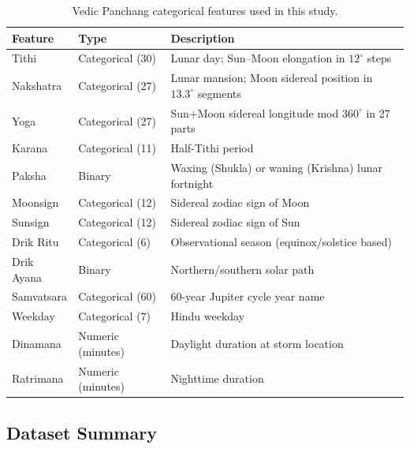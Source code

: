 \documentclass[12pt,a4paper]{article}
\begin{document}
    \begin{table}[H]
    \centering
    \caption{Vedic Panchang categorical features used in this study.}
    \label{tab:panchang_features}
    \small
    \begin{tabular}{llp{7.5cm}}
        \toprule
        \textbf{Feature} & \textbf{Type} & \textbf{Description} \\
        \midrule
        Tithi       & Categorical (30)  & Lunar day; Sun--Moon elongation in $12^\circ$ steps \\
        Nakshatra   & Categorical (27)  & Lunar mansion; Moon sidereal position in $13.3^\circ$ segments \\
        Yoga        & Categorical (27)  & Sun+Moon sidereal longitude mod $360^\circ$ in 27 parts \\
        Karana      & Categorical (11)  & Half-Tithi period \\
        Paksha      & Binary            & Waxing (Shukla) or waning (Krishna) lunar fortnight \\
        Moonsign    & Categorical (12)  & Sidereal zodiac sign of Moon \\
        Sunsign     & Categorical (12)  & Sidereal zodiac sign of Sun \\
        Drik Ritu   & Categorical (6)   & Observational season (equinox/solstice based) \\
        Drik Ayana  & Binary            & Northern/southern solar path \\
        Samvatsara  & Categorical (60)  & 60-year Jupiter cycle year name \\
        Weekday     & Categorical (7)   & Hindu weekday \\
        Dinamana    & Numeric (minutes) & Daylight duration at storm location \\
        Ratrimana   & Numeric (minutes) & Nighttime duration \\
        \bottomrule
    \end{tabular}
    \end{table}

    \subsection{Dataset Summary}
\end{document}
